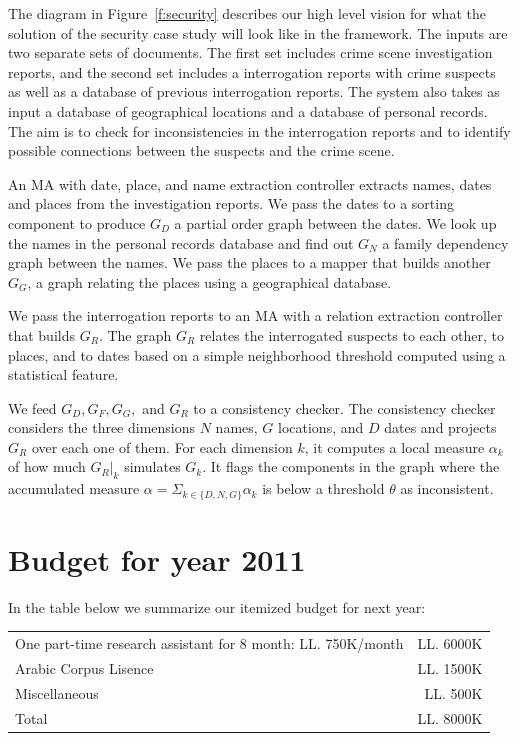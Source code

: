 \documentclass[12pt]{article}
\begin{document}
The diagram in Figure~\ref{f:security} describes our 
high level vision for what the solution of the 
security case study
will look like in the framework. 
The inputs are two separate sets of documents. 
The first set includes crime scene investigation reports, 
and the second set includes a 
interrogation reports with crime suspects as well as 
a database of previous interrogation reports. 
The system also takes as input a database of geographical
locations and a database of personal records. 
The aim is to check for inconsistencies in the interrogation
reports and to identify possible connections between the suspects
and the crime scene. 

An MA with date, place, and name extraction controller extracts
names, dates and places from the investigation reports. 
We pass the dates to a sorting component to produce $G_D$ 
a partial order graph between the dates. 
We look up the names in the personal records database and find out
$G_N$ a family dependency graph between the names. 
We pass the places to a mapper that builds another $G_G$,
a graph relating the places using a geographical database. 

We pass the interrogation reports to an MA with a relation 
extraction controller that builds $G_R$. 
The graph $G_R$ relates the interrogated suspects
to each other, to places, and to dates based on a simple
neighborhood threshold computed using a statistical feature. 

We feed $G_D, G_F, G_G,$ and $G_R$   
to a consistency checker.
The consistency checker considers the three dimensions 
$N$ names, $G$ locations, and $D$ dates and projects $G_R$
over each one of them.
For each dimension $k$, it computes a local measure 
$\alpha_k$ of how much $G_R|_k$ simulates $G_k$. 
It flags the components in the graph where the accumulated 
measure $\alpha= \Sigma_{k\in\{D,N,G\}} \alpha_k$ is
below a threshold $\theta$ as inconsistent. 

\section{Budget for year 2011}
\label{s:budget}

In the table below we summarize our itemized budget for next year:

\begin{table}[ht]
\begin{tabular}{l r}

 \hline
 One part-time research assistant for 8 month: LL. 750K/month  & LL. 6000K  \\
 Arabic Corpus Lisence & LL. 1500K \\
Miscellaneous  & LL. 500K \\
\hline
 Total  & LL. 8000K \\
 \hline
\end{tabular} 
\end{table}
\end{document}
